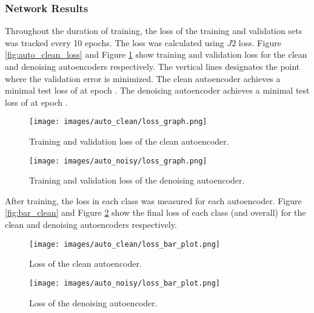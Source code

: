 \documentclass[a4paper, 12pt, titlepage]{article}
\newcommand{\figRef}[1]{Figure \ref{#1}}
\begin{document}
  \subsubsection{Network Results}
  \par Throughout the duration of training, the loss of the training and
  validation sets was tracked every 10 epochs.
  The loss was calculated using $J2$ loss.
  \figRef{fig:auto_clean_loss} and \figRef{fig:auto_noisy_loss} show training
  and validation loss for the clean and denoising autoencoders respectively.
  The vertical lines designates the point where the validation error is
  minimized.
  The clean autoencoder achieves a minimal test loss of
  \unskip{} at epoch
  \unskip{}.
  The denoising autoencoder achieves a minimal test loss of
  \unskip{} at epoch
  \unskip{}.
  \begin{figure}[htb]
    \vspace{-12pt}
    \begin{minipage}{0.45\textwidth}
      \centering
      \texttt{[image: images/auto\_clean/loss\_graph.png]}
      \caption{Training and validation loss of the clean autoencoder.}
      \label{fig:auto_clean_loss}
    \end{minipage}
    \hfill
    \begin{minipage}{0.45\textwidth}
      \centering
      \texttt{[image: images/auto\_noisy/loss\_graph.png]}
      \caption{Training and validation loss of the denoising autoencoder.}
      \label{fig:auto_noisy_loss}
    \end{minipage}
    \vspace{-12pt}
  \end{figure}
  \par After training, the loss in each class was measured for each
  autoencoder.
  \figRef{fig:bar_clean} and \figRef{fig:bar_noisy} show the final loss of each
  class (and overall) for the clean and denoising autoencoders respectively.
  \begin{figure}
    \begin{minipage}{0.45\textwidth}
      \centering
      \texttt{[image: images/auto\_clean/loss\_bar\_plot.png]}
      \caption{Loss of the clean autoencoder.}
      \label{fig:bar_clean}
    \end{minipage}
    \hfill
    \begin{minipage}{0.45\textwidth}
      \centering
      \texttt{[image: images/auto\_noisy/loss\_bar\_plot.png]}
      \caption{Loss of the denoising autoencoder.}
      \label{fig:bar_noisy}
    \end{minipage}
  \end{figure}
\end{document}
